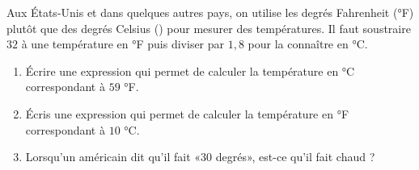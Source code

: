 
\begin{exercice}\label{exosmath-0734}

Aux États-Unis et dans quelques autres pays, on utilise les degrés Fahrenheit (°F) plutôt que des degrés Celsius (\celsius) pour mesurer des températures. Il faut soustraire $32$ à une température en °F puis diviser par $1,8$ pour la connaître en °C.  

\begin{enumerate}
    \item
        
Écrire une expression qui permet de calculer la température en °C correspondant à $59$ °F.
\item
Écris une expression qui permet de calculer la température en °F correspondant à $10$ °C.
\item
    Lorsqu'un américain dit qu'il fait «\( 30\) degrés», est-ce qu'il fait chaud ?
\end{enumerate}
\end{exercice}
